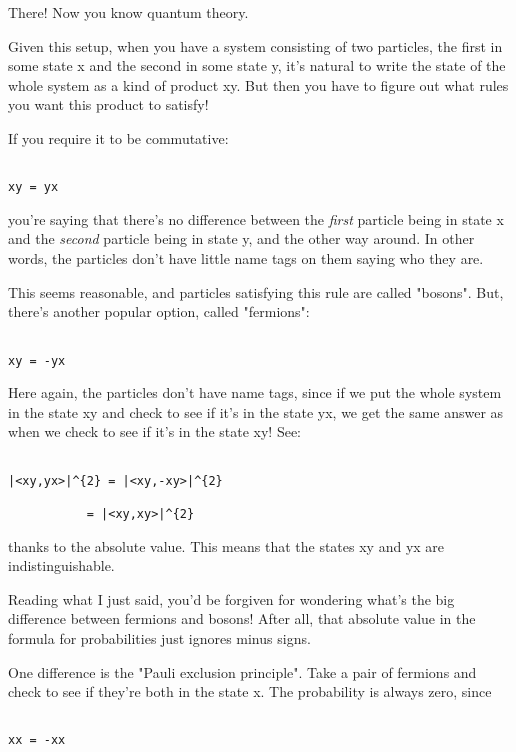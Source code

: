 There!  Now you know quantum theory.

Given this setup, when you have a system consisting of two particles, the 
first in some state x and the second in some state y, it's natural to 
write the state of the whole system as a kind of product xy.  But 
then you have to figure out what rules you want this product to satisfy!

If you require it to be commutative:


\begin{verbatim}

xy = yx
\end{verbatim}
    

you're saying that there's no difference between the \emph{first} particle
being in state x and the \emph{second} particle being in state y, and the
other way around.  In other words, the particles don't have little
name tags on them saying who they are. 

This seems reasonable, and particles satisfying this rule are called
"bosons".  But, there's another popular option, 
called "fermions":


\begin{verbatim}

xy = -yx
\end{verbatim}
    
Here again, the particles don't have name tags, since if we put
the whole system in the state xy and check to see if it's in the
state yx, we get the same answer as when we check to see if it's
in the state xy!  See:


\begin{verbatim}

|<xy,yx>|^{2} = |<xy,-xy>|^{2}

           = |<xy,xy>|^{2}
\end{verbatim}
    
thanks to the absolute value.  This means that the states xy and
yx are indistinguishable.   

Reading what I just said, you'd be forgiven for wondering what's the 
big difference between fermions and bosons!  After all, that absolute 
value in the formula for probabilities just ignores minus signs.

One difference is the "Pauli exclusion principle".  Take a pair of
fermions and check to see if they're both in the state x.  The 
probability is always zero, since


\begin{verbatim}

xx = -xx  
\end{verbatim}
    
